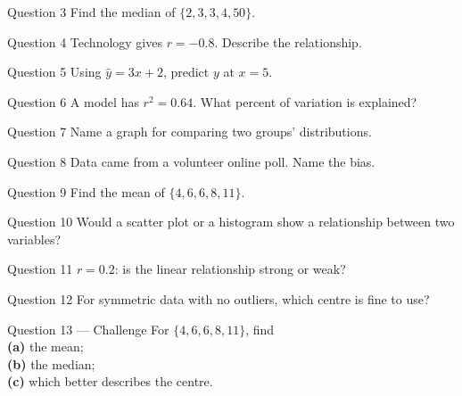 \documentclass[11pt]{article}
\begin{document}
\begin{qbox}{Question 3}
Find the median of $\{2,3,3,4,50\}$.\workspace{2.4cm}
\end{qbox}

\begin{qbox}{Question 4}
Technology gives $r=-0.8$. Describe the relationship.\workspace{2.4cm}
\end{qbox}

\begin{qbox}{Question 5}
Using $\hat y=3x+2$, predict $y$ at $x=5$.\workspace{2.4cm}
\end{qbox}

\begin{qbox}{Question 6}
A model has $r^{2}=0.64$. What percent of variation is explained?\workspace{2.4cm}
\end{qbox}

\begin{qbox}{Question 7}
Name a graph for comparing two groups' distributions.\workspace{2.4cm}
\end{qbox}

\begin{qbox}{Question 8}
Data came from a volunteer online poll. Name the bias.\workspace{2.4cm}
\end{qbox}

\begin{qbox}{Question 9}
Find the mean of $\{4,6,6,8,11\}$.\workspace{2.4cm}
\end{qbox}

\begin{qbox}{Question 10}
Would a scatter plot or a histogram show a relationship between two variables?\workspace{2.4cm}
\end{qbox}

\begin{qbox}{Question 11}
$r=0.2$: is the linear relationship strong or weak?\workspace{2.4cm}
\end{qbox}

\begin{qbox}{Question 12}
For symmetric data with no outliers, which centre is fine to use?\workspace{2.4cm}
\end{qbox}

\begin{qbox}{Question 13 --- Challenge}
For $\{4,6,6,8,11\}$, find \\ \textbf{(a)} the mean; \\ \textbf{(b)} the median; \\ \textbf{(c)} which better describes the centre.\workspace{3cm}
\end{qbox}
\end{document}
